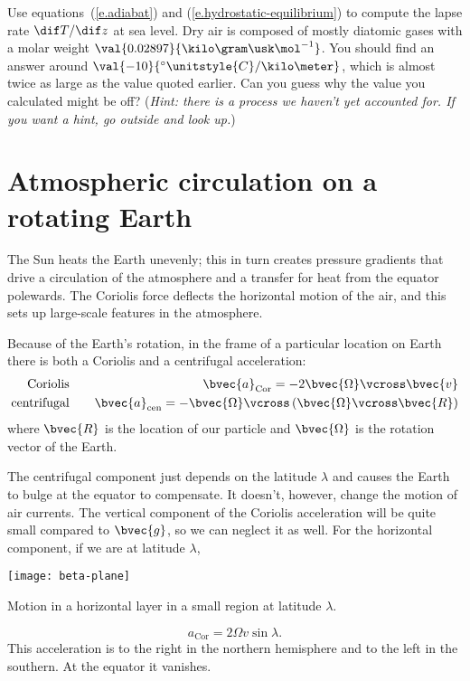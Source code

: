 \begin{exercisebox}
Use equations~(\ref{e.adiabat}) and (\ref{e.hydrostatic-equilibrium}) to compute the lapse rate $\dif T/\dif z$ at sea level.  Dry air is composed of mostly diatomic gases with a molar weight $\val{0.02897}{\kilo\gram\usk\mol^{-1}}$. You should find an answer around $\val{-10}{^{\circ}\unitstyle{C}/\kilo\meter}$, which is almost twice as large as the value quoted earlier.  Can you guess why the value you calculated might be off? (\emph{Hint: there is a process we haven't yet accounted for.  If you want a hint, go outside and look up.})
\end{exercisebox}

\section{Atmospheric circulation on a rotating Earth}\label{s.motion-in-atmosphere}

The Sun heats the Earth unevenly; this in turn creates pressure gradients that drive a circulation of the atmosphere and a transfer for heat from the equator polewards.  The Coriolis force deflects the horizontal motion of the air, and this sets up large-scale features in the atmosphere.

Because of the Earth's rotation, in the frame of a particular location on Earth there is both a Coriolis and a centrifugal acceleration:
\begin{eqnarray}
\textrm{Coriolis} &\quad& \bvec{a}_{\mathrm{Cor}} = -2\bvec{\Omega}\vcross\bvec{v}\\
\textrm{centrifugal} &\quad& \bvec{a}_{\mathrm{cen}} = -\bvec{\Omega}\vcross\left(\bvec{\Omega}\vcross\bvec{R}\right)
\end{eqnarray}
where $\bvec{R}$ is the location of our particle and $\bvec{\Omega}$ is the rotation vector of the Earth.  

The centrifugal component just depends on the latitude $\lambda$ and causes the Earth to bulge at the equator to compensate. It doesn't, however, change the motion of air currents.  The vertical component of the Coriolis acceleration will be quite small compared to $\bvec{g}$, so we can neglect it as well. For the horizontal component, if we are at latitude $\lambda$,
\begin{marginfigure}
\texttt{[image: beta-plane]}
\caption{Motion in a horizontal layer in a small region at latitude $\lambda$.}
\end{marginfigure}
\[
a_{\mathrm{Cor}} =  2\Omega v \sin\lambda.
\]
This acceleration is to the right in the northern hemisphere and to the left in the southern.  At the equator it vanishes.

